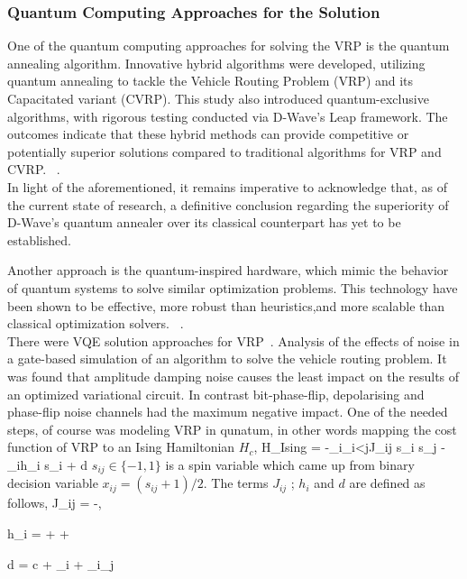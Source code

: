 \subsubsection{Quantum Computing Approaches for the Solution}\label{subsubsec:qc-approaches-for-solution}
One of the quantum computing approaches for solving the VRP is the quantum annealing algorithm.
Innovative hybrid algorithms were developed, utilizing quantum annealing to
tackle the Vehicle Routing Problem (VRP) and its Capacitated variant (CVRP).
This study also introduced quantum-exclusive algorithms, with rigorous testing conducted via D-Wave’s Leap framework.
The outcomes indicate that these hybrid methods can provide competitive or potentially superior solutions
compared to traditional algorithms for VRP and CVRP.
~\cite{borowski2020new}.\\
In light of the aforementioned, it remains imperative to acknowledge that,
as of the current state of research,
a definitive conclusion regarding the superiority of D-Wave's quantum annealer over its classical counterpart has yet to be established.

Another approach is the quantum-inspired hardware, which mimic the behavior of quantum systems to solve
similar optimization problems.
This technology have been shown to be effective, more robust than
heuristics,and more scalable than classical optimization solvers. ~\cite{9605345}.\\

There were VQE solution approaches for VRP~\cite{mohanty2022analysis}.
Analysis of the effects of noise in a gate-based
simulation of an algorithm to solve the vehicle routing problem.
It was found that amplitude damping
noise causes the least impact on the results of an optimized
variational circuit. In contrast bit-phase-flip, depolarising and
phase-flip noise channels had the maximum negative impact.
One of the needed steps, of course was modeling VRP in qunatum, in other words
mapping the cost function of VRP to an Ising Hamiltonian $H_c$,
\equation
{
    H_{Ising} = -\sum_{i}\sum_{i<j}J_{ij} s_i s_j
                -\sum_{i}h_i s_i + d
}
$s_{ij} \in \{-1, 1\}$ is a spin variable which came up from binary decision variable
$x_{ij} = (s_{ij} + 1)/2$.
The terms $J_{ij}$ ; $h_i$ and $d$ are defined as follows,
\equation
{
    J_{ij} = -, 
}


\equation
{
    h_{i} =  + \sum{} + \sum{}
}


\equation
{
    d = c + \sum_{i} + \sum_{i}\sum_{j}
}



